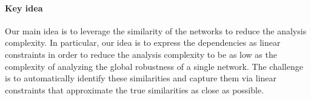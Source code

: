 



\paragraph{Key idea}
Our main idea is to leverage the similarity of the networks to reduce the analysis complexity. In particular, our idea is to express the dependencies as linear constraints in order to reduce the analysis complexity to be as low as the complexity of analyzing the global robustness of a single network.
The challenge is to automatically identify these similarities and capture them via linear constraints that approximate the true similarities as close as possible.

